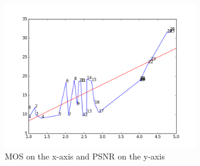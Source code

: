 \documentclass{article}
\begin{document}
\begin{figure}[ht]
  \centering
  \includegraphics[width=8.5cm]{figures/mos_psnr}
  \vspace{-5mm}
  \caption{MOS on the x-axis and PSNR on the y-axis\label{fig:psnr} }
\end{figure}
\end{document}
